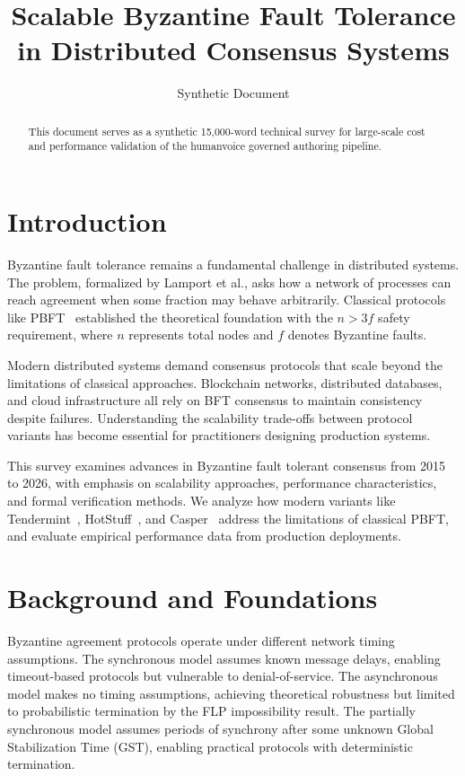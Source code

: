 \documentclass{article}
\title{Scalable Byzantine Fault Tolerance in Distributed Consensus Systems}
\author{Synthetic Document}
\date{}
\begin{document}
\maketitle

\begin{abstract}
This document serves as a synthetic 15,000-word technical survey for large-scale cost and performance validation of the humanvoice governed authoring pipeline.
\end{abstract}

\section{Introduction}

Byzantine fault tolerance remains a fundamental challenge in distributed systems. The problem, formalized by Lamport et al., asks how a network of processes can reach agreement when some fraction may behave arbitrarily. Classical protocols like PBFT~\cite{castro1999practical} established the theoretical foundation with the $n > 3f$ safety requirement, where $n$ represents total nodes and $f$ denotes Byzantine faults.

Modern distributed systems demand consensus protocols that scale beyond the limitations of classical approaches. Blockchain networks, distributed databases, and cloud infrastructure all rely on BFT consensus to maintain consistency despite failures. Understanding the scalability trade-offs between protocol variants has become essential for practitioners designing production systems.

This survey examines advances in Byzantine fault tolerant consensus from 2015 to 2026, with emphasis on scalability approaches, performance characteristics, and formal verification methods. We analyze how modern variants like Tendermint~\cite{buchman2016tendermint}, HotStuff~\cite{yin2019hotstuff}, and Casper~\cite{buterin2020combining} address the limitations of classical PBFT, and evaluate empirical performance data from production deployments.

\section{Background and Foundations}

Byzantine agreement protocols operate under different network timing assumptions. The synchronous model assumes known message delays, enabling timeout-based protocols but vulnerable to denial-of-service. The asynchronous model makes no timing assumptions, achieving theoretical robustness but limited to probabilistic termination by the FLP impossibility result. The partially synchronous model assumes periods of synchrony after some unknown Global Stabilization Time (GST), enabling practical protocols with deterministic termination.
\end{document}
